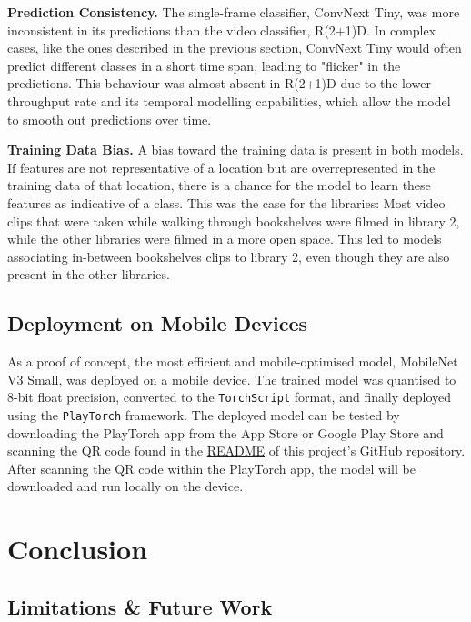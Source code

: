 \documentclass[a4paper]{article}
\begin{document}
\textbf{Prediction Consistency.} The single-frame classifier, ConvNext Tiny, was
more inconsistent in its predictions than the video classifier, R(2+1)D. In
complex cases, like the ones described in the previous section, ConvNext Tiny
would often predict different classes in a short time span, leading to "flicker"
in the predictions. This behaviour was almost absent in R(2+1)D due to
the lower throughput rate and its temporal modelling capabilities, which allow
the model to smooth out predictions over time.

\textbf{Training Data Bias.} A bias toward the training data is present in both
models. If features are not representative of a location but are overrepresented
in the training data of that location, there is a chance for the model to learn
these features as indicative of a class. This was the case for the libraries:
Most video clips that were taken while walking through bookshelves were filmed
in library 2, while the other libraries were filmed in a more open space. This
led to models associating in-between bookshelves clips to library 2, even though
they are also present in the other libraries.


\subsection{Deployment on Mobile Devices}
\label{sub:deploment}

As a proof of concept, the most efficient and mobile-optimised model, MobileNet
V3 Small, was deployed on a mobile device. The trained model was quantised to
8-bit float precision, converted to the \texttt{TorchScript} format, and finally
deployed using the \texttt{PlayTorch} framework. The deployed model can be
tested by downloading the PlayTorch app from the App Store or Google Play Store
and scanning the QR code found in the
\href{https://github.com/mikasenghaas/bsc}{README} of this project's GitHub
repository. After scanning the QR code within the PlayTorch app, the model will
be downloaded and run locally on the device.


\section{Conclusion}

\subsection{Limitations \& Future Work} %
\label{sub:limitations}
\end{document}
